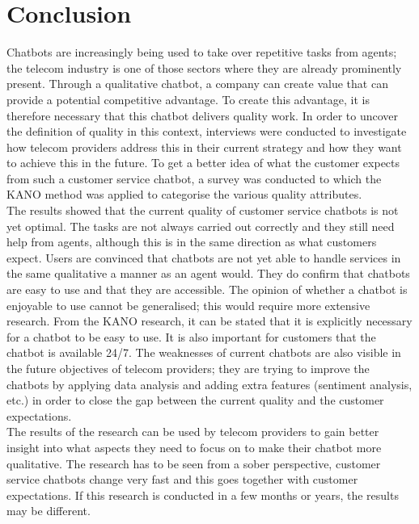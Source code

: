 \mainmatter
\pagestyle{headings}
\chapter{Conclusion}
\label{ch:conclusion}
Chatbots are increasingly being used to take over repetitive tasks from agents; the telecom industry is one of those sectors where they are already prominently present. Through a qualitative chatbot, a company can create value that can provide a potential competitive advantage. To create this advantage, it is therefore necessary that this chatbot delivers quality work. In order to uncover the definition of quality in this context, interviews were conducted to investigate how telecom providers address this in their current strategy and how they want to achieve this in the future. To get a better idea of what the customer expects from such a customer service chatbot, a survey was conducted to which the KANO method was applied to categorise the various quality attributes.\\
\break
The results showed that the current quality of customer service chatbots is not yet optimal. The tasks are not always carried out correctly and they still need help from agents, although this is in the same direction as what customers expect. Users are convinced that chatbots are not yet able to handle services in the same qualitative a manner as an agent would. They do confirm that chatbots are easy to use and that they are accessible. The opinion of whether a chatbot is enjoyable to use cannot be generalised; this would require more extensive research. From the KANO research, it can be stated that it is explicitly necessary for a chatbot to be easy to use. It is also important for customers that the chatbot is available 24/7. The weaknesses of current chatbots are also visible in the future objectives of telecom providers; they are trying to improve the chatbots by applying data analysis and adding extra features (sentiment analysis, etc.) in order to close the gap between the current quality and the customer expectations.\\
\break
The results of the research can be used by telecom providers to gain better insight into what aspects they need to focus on to make their chatbot more qualitative. The research has to be seen from a sober perspective, customer service chatbots change very fast and this goes together with customer expectations. If this research is conducted in a few months or years, the results may be different.